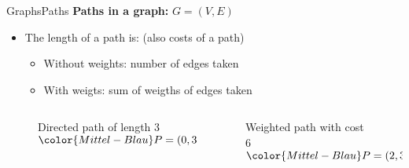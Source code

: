 
\begin{frame}{Graphs}{Paths}
  \textbf{Paths in a graph:}
  {\color{Mittel-Blau}$G = (V , E)$}
  \begin{itemize}
    \item
      The {\color{Mittel-Blau}length of a path} is:
      (also costs of a path)
      \begin{itemize}
        \item
          Without weights:
          {\color{Mittel-Blau}number of edges} taken
        \item
          With weigts:
          {\color{Mittel-Blau}sum of weigths of edges} taken
      \end{itemize}
  \end{itemize}
  \begin{columns}
    \begin{column}[b]{0.5\linewidth}
      \begin{figure}
        \begin{adjustbox}{width=0.95\linewidth}
          
        \end{adjustbox}
        \caption{{\color{Mittel-Blau}Directed path} of length 3 \newline
          ${\color{Mittel-Blau}P} = (0, 3, 1, 4)$}
        \label{fig:graphs:directed_path_length}
      \end{figure}
    \end{column}
    \begin{column}[b]{0.5\linewidth}
      \begin{figure}
        \begin{adjustbox}{width=0.8\linewidth}
          
        \end{adjustbox}
        \caption{{\color{Mittel-Blau}Weighted path} with cost 6 \newline
          ${\color{Mittel-Blau}P} = (2, 3, 1)$}
        \label{fig:graphs:weighted_path_length}
      \end{figure}
    \end{column}
  \end{columns}
\end{frame}


